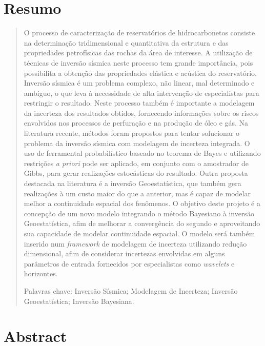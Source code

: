 \chapter*{Resumo}


\begin{quotation}

\noindent O processo de caracterização de reservatórios de hidrocarbonetos
consiste na determinação tridimensional e quantitativa da estrutura e das
propriedades petrofísicas das rochas da área de interesse. A utilização de
técnicas de inversão sísmica neste processo tem grande importância, pois
possibilita a obtenção das propriedades elástica e acústica do reservatório.
Inversão sísmica é um problema complexo, não linear, mal determinado e ambíguo,
o que leva à necessidade de alta intervenção de especialistas para restringir o
resultado. Neste processo também é importante a modelagem da incerteza dos
resultados obtidos, fornecendo informações sobre os riscos envolvidos nos
processos de perfuração e na produção de óleo e gás. Na literatura recente,
métodos foram propostos para tentar solucionar o problema da inversão sísmica
com modelagem de incerteza integrada. O uso de ferramental probabilístico
baseado no teorema de Bayes e utilizando restrições \textit{a priori} pode ser
aplicado, em conjunto com o amostrador de Gibbs, para gerar realizações
estocásticas do resultado. Outra proposta destacada na literatura é a inversão
Geoestatística, que também gera realizações à um custo maior do que a anterior,
mas é capaz de modelar melhor a continuidade espacial dos fenômenos. O objetivo
deste projeto é a concepção de um novo modelo integrando o método Bayesiano à
inversão Geoestatística, afim de melhorar a convergência do segundo e
aproveitando sua capacidade de modelar continuidade espacial. O modelo será
também inserido num \textit{framework} de modelagem de incerteza utilizando
redução dimensional, afim de considerar incertezas envolvidas em alguns
parâmetros de entrada fornecidos por especialistas como \textit{wavelets} e
horizontes.

\vspace*{0.5cm}

\noindent Palavras chave: Inversão Sísmica; Modelagem de Incerteza; Inversão Geoestatística; Inversão Bayesiana.

\end{quotation}


\chapter*{Abstract}


